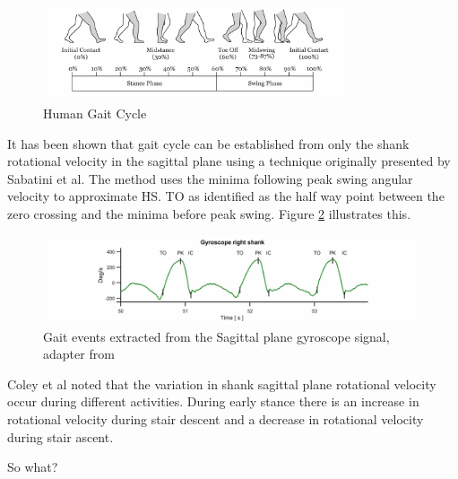 \begin{figure}[!htb]
    \centering
    \includegraphics[width=0.8\textwidth]{Figures/Gait_Cycle.jpg}
    \caption{Human Gait Cycle}
    \label{fig:gait_cycle}
\end{figure}

It has been shown that gait cycle can be established from only the shank rotational velocity in the sagittal plane using a technique originally presented by Sabatini et al\cite{Sabatini2005}. The method uses the minima following peak swing angular velocity to approximate HS. TO as identified as the half way point between the zero crossing and the minima before peak swing. Figure \ref{fig:y-gyro-hs-to} illustrates this.

\begin{figure}[!htb]
    \centering
    \includegraphics[width=\textwidth]{Figures/gyro_trace_hs.jpg}
    \caption{Gait events extracted from the Sagittal plane gyroscope signal, adapter from \cite{Sabatini2005}}
    \label{fig:y-gyro-hs-to}
\end{figure}

Coley et al noted that the variation in shank sagittal plane rotational velocity occur during different activities. During early stance there is an increase in rotational velocity during stair descent and a decrease in rotational velocity during stair ascent.\cite{Coley2005}

So what?
